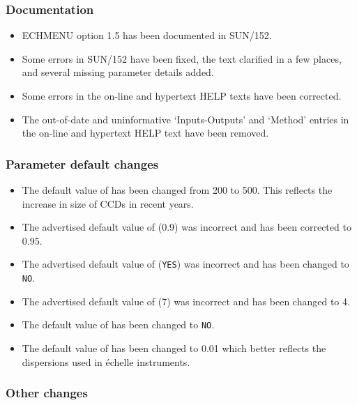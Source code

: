 \subsubsection{Documentation}

\begin{itemize}
\item ECHMENU option 1.5 has been documented in SUN/152.
\item Some errors in SUN/152 have been fixed, the text clarified in
   a few places, and several missing parameter details added.
\item Some errors in the on-line and hypertext HELP texts have been
   corrected.
\item The out-of-date and uninformative `Inputs-Outputs' and `Method'
   entries in the on-line and hypertext HELP text have been removed.
\end{itemize}

\subsubsection{Parameter default changes}

\begin{itemize}
\item The default value of 
   has been changed from 200 to 500.
   This reflects the increase in size of CCDs in recent years.
\item The advertised default value of
    (0.9) was incorrect and
   has been corrected to 0.95.
\item The advertised default value of
    (\verb+YES+) was
   incorrect and has been changed to \verb+NO+.
\item The advertised default value of
   (7) was incorrect and has been changed to 4.
\item The default value of 
   has been changed to \verb+NO+.
\item The default value of 
   has been changed to 0.01 which better reflects the dispersions used in
   \'{e}chelle instruments.
\end{itemize}

\subsubsection{Other changes}

